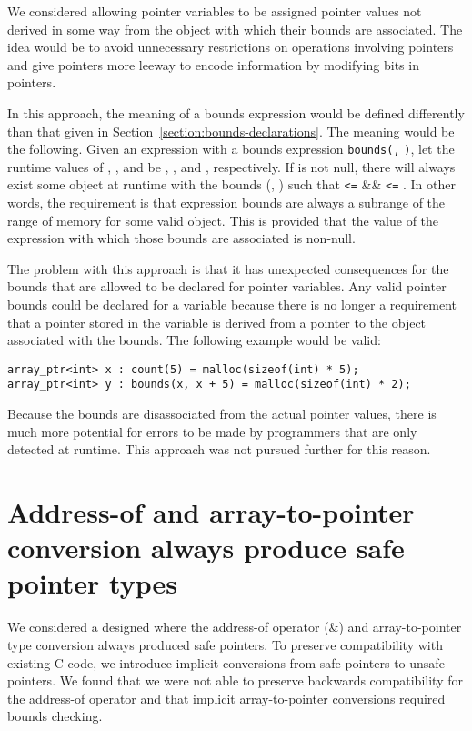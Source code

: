 We considered allowing pointer variables to be assigned pointer values
not derived in some way from the object with which their bounds are
associated. The idea would be to avoid unnecessary restrictions on
operations involving pointers and give pointers more leeway to encode
information by modifying bits in pointers.

In this approach, the meaning of a bounds expression would be defined
differently than that given in Section~\ref{section:bounds-declarations}. 
The meaning would be the
following. Given an expression  with a bounds expression
\texttt{bounds(}\texttt{,} \texttt{)}, let the runtime
values of , , and  be , ,
and , respectively. If  is not null, there will
always exist some object at runtime with the bounds (,
) such that  \texttt{\textless{}=}  \&\&
 \texttt{\textless{}=} . In other words, the
requirement is that expression bounds are always a subrange of the range
of memory for some valid object. This is provided that the value of the
expression with which those bounds are associated is non-null.

The problem with this approach is that it has unexpected consequences
for the bounds that are allowed to be declared for pointer variables.
Any valid pointer bounds could be declared for a variable because there
is no longer a requirement that a pointer stored in the variable is
derived from a pointer to the object associated with the bounds. The
following example would be valid:

\begin{verbatim}
array_ptr<int> x : count(5) = malloc(sizeof(int) * 5);
array_ptr<int> y : bounds(x, x + 5) = malloc(sizeof(int) * 2);
\end{verbatim}

Because the bounds are disassociated from the actual pointer values,
there is much more potential for errors to be made by programmers that
are only detected at runtime. This approach was not pursued further for
this reason.

\section{Address-of and array-to-pointer conversion always produce safe pointer types}

We considered a designed where the address-of operator (\&) and
array-to-pointer type conversion always produced safe pointers. To
preserve compatibility with existing C code, we introduce implicit
conversions from safe pointers to unsafe pointers. We found that we were
not able to preserve backwards compatibility for the address-of operator
and that implicit array-to-pointer conversions required bounds checking.

